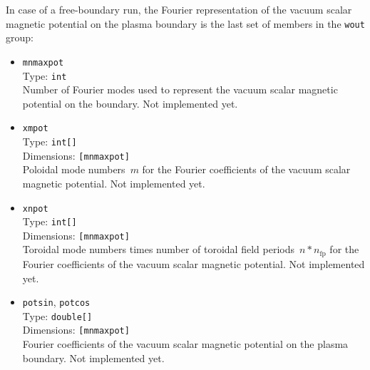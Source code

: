 %
In case of a free-boundary run,
the Fourier representation of
the vacuum scalar magnetic potential on the plasma boundary
is the last set of members in the \texttt{wout} group:
\begin{itemize}
 \item \texttt{mnmaxpot} \\
       Type: \texttt{int} \\
       Number of Fourier modes used to represent
       the vacuum scalar magnetic potential on the boundary.
       Not implemented yet.
 \item \texttt{xmpot} \\
       Type: \texttt{int[]} \\
       Dimensions: \texttt{[mnmaxpot]} \\
       Poloidal mode numbers~$m$ for the Fourier coefficients
       of the vacuum scalar magnetic potential.
       Not implemented yet.
 \item \texttt{xnpot} \\
       Type: \texttt{int[]} \\
       Dimensions: \texttt{[mnmaxpot]} \\
       Toroidal mode numbers times number of toroidal field periods~$n * n_\textrm{fp}$
       for the Fourier coefficients
       of the vacuum scalar magnetic potential.
       Not implemented yet.
 \item \texttt{potsin}, \texttt{potcos} \\
       Type: \texttt{double[]} \\
       Dimensions: \texttt{[mnmaxpot]} \\
       Fourier coefficients of the vacuum scalar magnetic potential on the plasma boundary.
       Not implemented yet.
\end{itemize}
